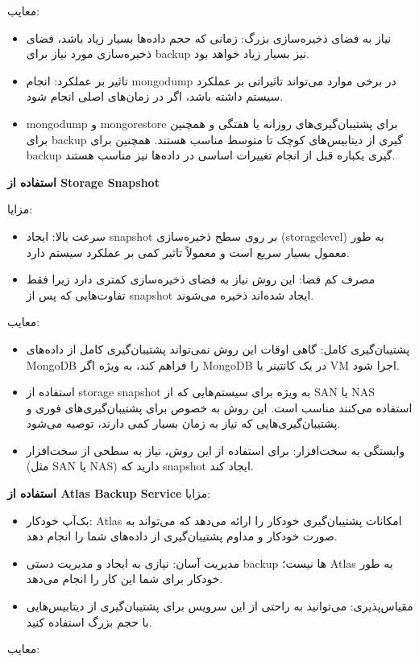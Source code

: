 معایب:

\begin{itemize}
	
	
	\item نیاز به فضای ذخیره‌سازی بزرگ: زمانی که حجم داده‌ها بسیار زیاد باشد، فضای ذخیره‌سازی مورد نیاز برای backup نیز بسیار زیاد خواهد بود.
	\item تاثیر بر عملکرد: انجام mongodump در برخی موارد می‌تواند تاثیراتی بر عملکرد سیستم داشته باشد، اگر در زمان‌های اصلی انجام شود.
	\item mongodump و mongorestore برای پشتیبان‌گیری‌های روزانه یا هفتگی و همچنین برای backup گیری از دیتابیس‌های کوچک تا متوسط مناسب هستند. همچنین برای backup گیری یکباره قبل از انجام تغییرات اساسی در داده‌ها نیز مناسب هستند.
\end{itemize}


\textbf{استفاده از Storage Snapshot}

مزایا:
\begin{itemize}
	\item سرعت بالا:
	 ایجاد snapshot بر روی سطح ذخیره‌سازی (storagelevel) به طور معمول بسیار سریع است و معمولاً تاثیر کمی بر عملکرد سیستم دارد.
	\item مصرف کم فضا: این روش نیاز به فضای ذخیره‌سازی کمتری دارد زیرا فقط تفاوت‌هایی که پس از snapshot ایجاد شده‌اند ذخیره می‌شوند.
\end{itemize}

معایب:

\begin{itemize}

	\item پشتیبان‌گیری کامل: گاهی اوقات این روش نمی‌تواند پشتیبان‌گیری کامل از داده‌های MongoDB را فراهم کند، به ویژه اگر MongoDB در یک کانتینر یا VM اجرا شود.
	\item استفاده از storage snapshot به ویژه برای سیستم‌هایی که از SAN یا NAS استفاده می‌کنند مناسب است. این روش به خصوص برای پشتیبان‌گیری‌های فوری و پشتیبان‌گیری‌هایی که نیاز به زمان بسیار کمی دارند، توصیه می‌شود.
		\item وابستگی به سخت‌افزار: برای استفاده از این روش، نیاز به سطحی از سخت‌افزار (مثل SAN یا NAS) دارید که snapshot ایجاد کند.
	
\end{itemize}


\textbf{استفاده از Atlas Backup Service}
مزایا:

\begin{itemize}
	\item بک‌آپ خودکار: Atlas امکانات پشتیبان‌گیری خودکار را ارائه می‌دهد که می‌تواند به صورت خودکار و مداوم پشتیبان‌گیری از داده‌های شما را انجام دهد.
	\item مدیریت آسان: نیازی به ایجاد و مدیریت دستی backup ها نیست؛ Atlas به طور خودکار برای شما این کار را انجام می‌دهد.
	\item مقیاس‌پذیری: می‌توانید به راحتی از این سرویس برای پشتیبان‌گیری از دیتابیس‌هایی با حجم بزرگ استفاده کنید.
\end{itemize}
معایب:

